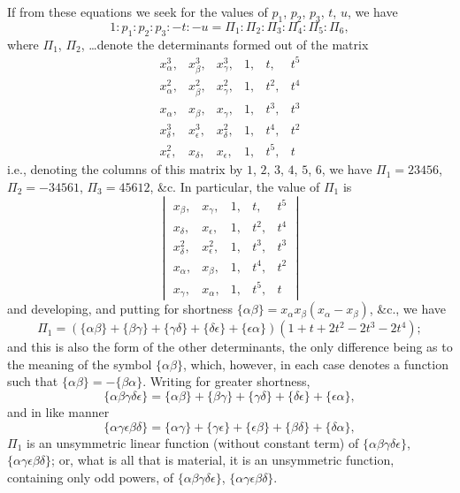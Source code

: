 \documentclass[11pt,a4paper]{article}
\theoremstyle{plain}
\begin{document}
If from these equations we seek for the values of $p_1$, $p_2$, $p_3$, $t$, $u$, we have
\[
1 : p_1 : p_2 : p_3 : -t : -u = \Pi_1 : \Pi_2 : \Pi_3 : \Pi_4 : \Pi_5 : \Pi_6,
\]
where $\Pi_1$, $\Pi_2$, \ldots denote the determinants formed out of the matrix
\[
\begin{matrix}
x_\alpha^3, & x_\beta^3, & x_\gamma^3, & 1, & t, & t^5 \\
x_\alpha^2, & x_\beta^2, & x_\gamma^2, & 1, & t^2, & t^4 \\
x_\alpha, & x_\beta, & x_\gamma, & 1, & t^3, & t^3 \\
x_\delta^3, & x_\epsilon^3, & x_\delta^2, & 1, & t^4, & t^2 \\
x_\epsilon^2, & x_\delta, & x_\epsilon, & 1, & t^5, & t
\end{matrix}
\]
i.e., denoting the columns of this matrix by $1$, $2$, $3$, $4$, $5$, $6$, we have $\Pi_1 = 23456$, $\Pi_2 = -34561$, $\Pi_3 = 45612$, \&c. In particular, the value of $\Pi_1$ is
\[
\begin{vmatrix}
x_\beta, & x_\gamma, & 1, & t, & t^5 \\
x_\delta, & x_\epsilon, & 1, & t^2, & t^4 \\
x_\delta^2, & x_\epsilon^2, & 1, & t^3, & t^3 \\
x_\alpha, & x_\beta, & 1, & t^4, & t^2 \\
x_\gamma, & x_\alpha, & 1, & t^5, & t
\end{vmatrix}
\]
and developing, and putting for shortness $\{\alpha\beta\} = x_\alpha x_\beta(x_\alpha - x_\beta)$, \&c., we have
\[
\Pi_1 = (\{\alpha\beta\} + \{\beta\gamma\} + \{\gamma\delta\} + \{\delta\epsilon\} + \{\epsilon\alpha\})(1 + t + 2t^2 - 2t^3 - 2t^4);
\]
and this is also the form of the other determinants, the only difference being as to the meaning of the symbol $\{\alpha\beta\}$, which, however, in each case denotes a function such that $\{\alpha\beta\} = -\{\beta\alpha\}$. Writing for greater shortness,
\[
\{\alpha\beta\gamma\delta\epsilon\} = \{\alpha\beta\} + \{\beta\gamma\} + \{\gamma\delta\} + \{\delta\epsilon\} + \{\epsilon\alpha\},
\]
and in like manner
\[
\{\alpha\gamma\epsilon\beta\delta\} = \{\alpha\gamma\} + \{\gamma\epsilon\} + \{\epsilon\beta\} + \{\beta\delta\} + \{\delta\alpha\},
\]
$\Pi_1$ is an unsymmetric linear function (without constant term) of $\{\alpha\beta\gamma\delta\epsilon\}$, $\{\alpha\gamma\epsilon\beta\delta\}$; or, what is all that is material, it is an unsymmetric function, containing only odd powers, of $\{\alpha\beta\gamma\delta\epsilon\}$, $\{\alpha\gamma\epsilon\beta\delta\}$.
\end{document}
